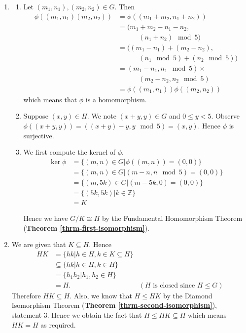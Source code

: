 \begin{enumerate}
    \item \begin{enumerate}[label=(\roman*)]
        \item Let $(m_1, n_1), (m_2, n_2) \in G$. Then
        \begin{align*}
            \phi((m_1, n_1)(m_2, n_2)) &= \phi((m_1 + m_2, n_1 + n_2))\\
            &= (m_1 + m_2 - n_1 - n_2,\\
            &\quad\quad\quad(n_1 + n_2) \mod 5)\\
            &= ((m_1 - n_1) + (m_2 - n_2),\\
            &\quad\quad\quad(n_1 \mod 5) + (n_2 \mod 5))\\
            &= (m_1 - n_1, n_1 \mod 5) \times \\
            &\quad\quad\quad(m_2 - n_2, n_2 \mod5)\\
            &= \phi((m_1, n_1))\phi((m_2, n_2))
        \end{align*}
        which means that $\phi$ is a homomorphism.
        
        \item Suppose $(x, y) \in H$. We note $(x+y, y) \in G$ and $0 \leq y < 5$. Observe $\phi((x+y, y)) = ((x+y) - y, y \mod 5) = (x, y)$. Hence $\phi$ is surjective.
        
        \item We first compute the kernel of $\phi$.
        \begin{align*}
            \ker\phi &= \{(m, n) \in G \vert \phi((m, n)) = (0, 0)\}\\
            &= \{(m, n) \in G \vert (m-n, n \mod 5) = (0, 0)\}\\
            &= \{(m, 5k) \in G \vert (m - 5k, 0) = (0, 0)\}\\
            &= \{(5k, 5k) \vert k \in \mathbb{Z}\}\\
            &= K
        \end{align*}
        
        Hence we have $G / K \cong H$ by the Fundamental Homomorphism Theorem (\textbf{Theorem \ref{thrm-first-isomorphism}}).
    \end{enumerate}
    
    \item We are given that $K \subseteq H$. Hence
    \begin{align*}
        HK &= \{hk \vert h \in H, k \in K \subseteq H\}\\
        &\subseteq \{hk \vert h \in H, k \in H\}\\
        &= \{h_1h_2 \vert h_1, h_2 \in H\}\\
        &= H. & (H \text{ is closed since } H \leq G)
    \end{align*}
    Therefore $HK \subseteq H$. Also, we know that $H \leq HK$ by the Diamond Isomorphism Theorem (\textbf{Theorem \ref{thrm-second-isomorphism}}), statement 3. Hence we obtain the fact that $H \leq HK \subseteq H$ which means $HK = H$ as required.
    

\end{enumerate}
